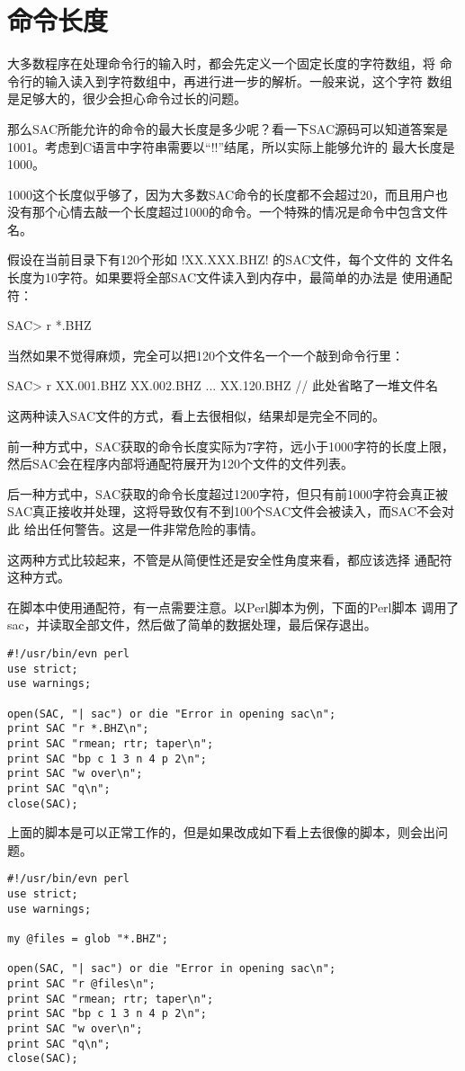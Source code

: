 \section{命令长度}
大多数程序在处理命令行的输入时，都会先定义一个固定长度的字符数组，将
命令行的输入读入到字符数组中，再进行进一步的解析。一般来说，这个字符
数组是足够大的，很少会担心命令过长的问题。

那么SAC所能允许的命令的最大长度是多少呢？看一下SAC源码可以知道答案是
1001。考虑到C语言中字符串需要以``!\0!''结尾，所以实际上能够允许的
最大长度是1000。

1000这个长度似乎够了，因为大多数SAC命令的长度都不会超过20，而且用户也
没有那个心情去敲一个长度超过1000的命令。一个特殊的情况是命令中包含文件名。

假设在当前目录下有120个形如 !XX.XXX.BHZ! 的SAC文件，每个文件的
文件名长度为10字符。如果要将全部SAC文件读入到内存中，最简单的办法是
使用通配符：
\begin{SACCode}
SAC> r *.BHZ
\end{SACCode}
当然如果不觉得麻烦，完全可以把120个文件名一个一个敲到命令行里：
\begin{SACCode}
SAC> r XX.001.BHZ XX.002.BHZ ... XX.120.BHZ // 此处省略了一堆文件名
\end{SACCode}

这两种读入SAC文件的方式，看上去很相似，结果却是完全不同的。

前一种方式中，SAC获取的命令长度实际为7字符，远小于1000字符的长度上限，
然后SAC会在程序内部将通配符展开为120个文件的文件列表。

后一种方式中，SAC获取的命令长度超过1200字符，但只有前1000字符会真正被
SAC真正接收并处理，这将导致仅有不到100个SAC文件会被读入，而SAC不会对此
给出任何警告。这是一件非常危险的事情。

这两种方式比较起来，不管是从简便性还是安全性角度来看，都应该选择
通配符这种方式。

在脚本中使用通配符，有一点需要注意。以Perl脚本为例，下面的Perl脚本
调用了sac，并读取全部文件，然后做了简单的数据处理，最后保存退出。

\begin{verbatim}
#!/usr/bin/evn perl
use strict;
use warnings;

open(SAC, "| sac") or die "Error in opening sac\n";
print SAC "r *.BHZ\n";
print SAC "rmean; rtr; taper\n";
print SAC "bp c 1 3 n 4 p 2\n";
print SAC "w over\n";
print SAC "q\n";
close(SAC);
\end{verbatim}

上面的脚本是可以正常工作的，但是如果改成如下看上去很像的脚本，则会出问题。
\begin{verbatim}
#!/usr/bin/evn perl
use strict;
use warnings;

my @files = glob "*.BHZ";

open(SAC, "| sac") or die "Error in opening sac\n";
print SAC "r @files\n";
print SAC "rmean; rtr; taper\n";
print SAC "bp c 1 3 n 4 p 2\n";
print SAC "w over\n";
print SAC "q\n";
close(SAC);
\end{verbatim}

